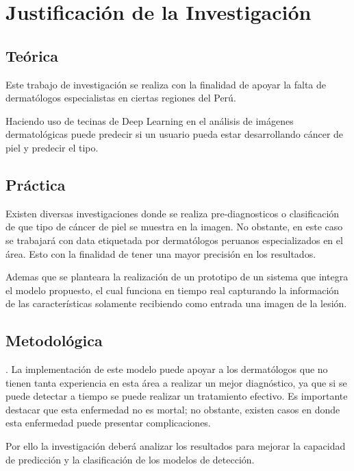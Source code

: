 

\section{Justificación de la Investigación}

\subsection{Teórica}
Este trabajo de investigación se realiza con la finalidad de apoyar la falta de dermatólogos especialistas en ciertas regiones del Perú.

Haciendo uso de tecinas de Deep Learning en el análisis de imágenes dermatológicas puede predecir si un usuario pueda estar desarrollando cáncer de piel y predecir el tipo. 


\subsection{Práctica}
Existen diversas investigaciones donde se realiza pre-diagnosticos o clasificación de que tipo de cáncer de piel se muestra en la imagen. No obstante, en este caso se trabajará con data etiquetada por dermatólogos peruanos especializados en el área. Esto con la finalidad de tener una mayor precisión en los resultados.

Ademas que se planteara la realización de un prototipo de un sistema que integra el modelo propuesto, el cual funciona en tiempo real capturando la información de las características solamente recibiendo como entrada una imagen de la lesión. 


\subsection{Metodológica}. 
La implementación de este modelo puede apoyar a los dermatólogos que no tienen tanta experiencia en esta área a realizar un mejor diagnóstico, ya que si se puede detectar a tiempo se puede realizar un tratamiento efectivo. Es importante destacar que esta enfermedad no es mortal; no obstante, existen casos en donde esta enfermedad puede presentar complicaciones. 

Por ello la investigación deberá analizar los resultados para mejorar la capacidad de predicción y la clasificación de los modelos de detección.

